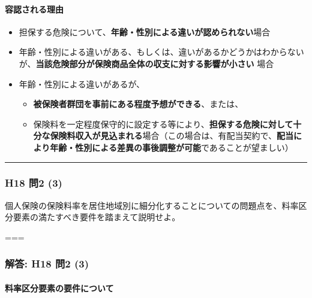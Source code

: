 \documentclass[
]{article}
\providecommand{\tightlist}{%
  \setlength{\itemsep}{0pt}\setlength{\parskip}{0pt}}
\begin{document}
\hypertarget{ux5bb9ux8a8dux3055ux308cux308bux7406ux7531}{%
\paragraph{容認される理由}\label{ux5bb9ux8a8dux3055ux308cux308bux7406ux7531}}

\begin{itemize}
\tightlist
\item
  担保する危険について、\textbf{年齢・性別による違いが認められない}場合
\item
  年齢・性別による違いがある、もしくは、違いがあるかどうかはわからないが、\textbf{当該危険部分が保険商品全体の収支に対する影響が小さい}
  場合
\item
  年齢・性別による違いがあるが、

  \begin{itemize}
  \tightlist
  \item
    \textbf{被保険者群団を事前にある程度予想ができる}、または、
  \item
    保険料を一定程度保守的に設定する等により、\textbf{担保する危険に対して十分な保険料収入が見込まれる}場合（この場合は、有配当契約で、\textbf{配当により年齢・性別による差異の事後調整が可能}であることが望ましい）
  \end{itemize}
\end{itemize}

\begin{center}\rule{0.5\linewidth}{0.5pt}\end{center}

\hypertarget{h18-ux554f2-3}{%
\subsubsection{H18 問2 (3)}\label{h18-ux554f2-3}}

個人保険の保険料率を居住地域別に細分化することについての問題点を、料率区分要素の満たすべき要件を踏まえて説明せよ。

===

\hypertarget{ux89e3ux7b54-h18-ux554f2-3}{%
\subsubsection{解答: H18 問2 (3)}\label{ux89e3ux7b54-h18-ux554f2-3}}

\hypertarget{ux6599ux7387ux533aux5206ux8981ux7d20ux306eux8981ux4ef6ux306bux3064ux3044ux3066}{%
\paragraph{料率区分要素の要件について}\label{ux6599ux7387ux533aux5206ux8981ux7d20ux306eux8981ux4ef6ux306bux3064ux3044ux3066}}
\end{document}
